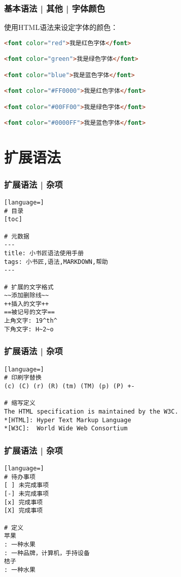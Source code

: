 \begin{frame}[fragile]
  \frametitle{基本语法 | 其他 | 字体颜色}
  使用HTML语法来设定字体的颜色：
\begin{lstlisting}[language=HTML]
<font color="red">我是红色字体</font> 

<font color="green">我是绿色字体</font> 

<font color="blue">我是蓝色字体</font> 

<font color="#FF0000">我是红色字体</font> 

<font color="#00FF00">我是绿色字体</font> 

<font color="#0000FF">我是蓝色字体</font> 
\end{lstlisting}
\end{frame}

\section{扩展语法}
\begin{frame}[fragile]
  \frametitle{扩展语法 | 杂项}
\begin{lstlisting}[language=]
# 目录
[toc]

# 元数据
---
title: 小书匠语法使用手册
tags: 小书匠,语法,MARKDOWN,帮助
--- 

# 扩展的文字格式
~~添加删除线~~
++插入的文字++
==被记号的文字==
上角文字: 19^th^
下角文字: H~2~o
\end{lstlisting}
\end{frame}

\begin{frame}[fragile]
  \frametitle{扩展语法 | 杂项}
\begin{lstlisting}[language=]
# 印刷字替换
(c) (C) (r) (R) (tm) (TM) (p) (P) +-

# 缩写定义
The HTML specification is maintained by the W3C.
*[HTML]: Hyper Text Markup Language
*[W3C]:  World Wide Web Consortium
\end{lstlisting}
\end{frame}

\begin{frame}[fragile]
  \frametitle{扩展语法 | 杂项}
\begin{lstlisting}[language=]
# 待办事项
[ ] 未完成事项
[-] 未完成事项
[x] 完成事项
[X] 完成事项

# 定义
苹果
: 一种水果
: 一种品牌，计算机，手持设备
桔子
: 一种水果
\end{lstlisting}
\end{frame}

